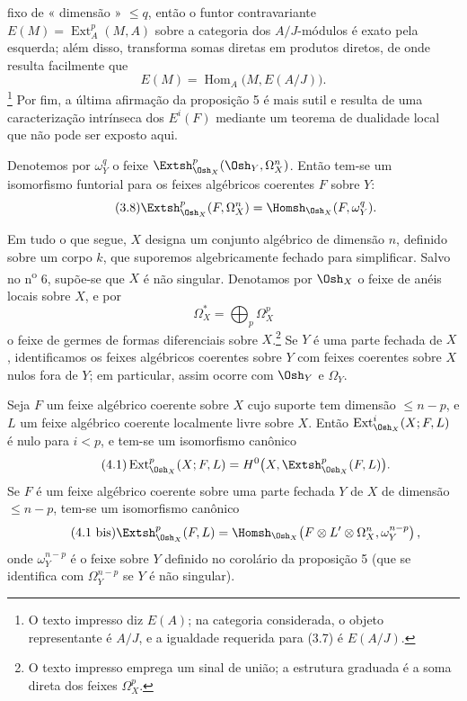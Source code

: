 fixo de « dimensão » $\leq q$, então o funtor contravariante
$E(M)=\operatorname{Ext}_{A}^{p}(M,A)$ sobre a categoria dos $A/J$-módulos é
exato pela esquerda; além disso, transforma somas diretas em produtos diretos,
de onde resulta facilmente que
\[
  E(M)=\operatorname{Hom}_{A}\bigl(M,E(A/J)\bigr).
\]
\footnote{O texto impresso diz $E(A)$; na categoria considerada, o objeto
representante é $A/J$, e a igualdade requerida para (3.7) é $E(A/J)$.} Por fim, a
última afirmação da proposição 5 é mais sutil e resulta de uma
caracterização intrínseca dos $E^{i}(F)$ mediante um teorema de dualidade
local que não pode ser exposto aqui.

 Denotemos por $\omega_Y^{q}$ o feixe
$\Extsh_{\Osh_X}^{p}(\Osh_Y,\Omega_X^{n})$. Então tem-se um isomorfismo
funtorial para os feixes algébricos coerentes $F$ sobre $Y$:
\begin{equation}\tag{3.8}
  \Extsh_{\Osh_X}^{p}(F,\Omega_X^{n})
  =\Homsh_{\Osh_X}(F,\omega_Y^{q}).
\end{equation}


Em tudo o que segue, $X$ designa um conjunto algébrico de dimensão $n$, definido
sobre um corpo $k$, que suporemos algebricamente fechado para simplificar. Salvo
no n\textsuperscript{o} 6, supõe-se que $X$ é não singular. Denotamos por
$\Osh_X$ o feixe de anéis locais sobre $X$, e por
\[
  \Omega_X^{*}=\bigoplus_p\Omega_X^{p}
\]
o feixe de germes de formas diferenciais sobre $X$.\footnote{O texto
impresso emprega um sinal de união; a estrutura graduada é a soma direta
dos feixes $\Omega_X^p$.} Se $Y$ é uma parte fechada de $X$, identificamos
os feixes algébricos coerentes sobre $Y$ com feixes coerentes sobre $X$
nulos fora de $Y$; em particular, assim ocorre com $\Osh_Y$ e $\Omega_Y$.

 Seja $F$ um feixe algébrico coerente sobre $X$ cujo
suporte tem dimensão $\leq n-p$, e $L$ um feixe algébrico coerente
localmente livre sobre $X$. Então $\operatorname{Ext}_{\Osh_X}^{i}(X;F,L)$ é nulo
para $i<p$, e tem-se um isomorfismo canônico
\begin{equation}\tag{4.1}
  \operatorname{Ext}_{\Osh_X}^{p}(X;F,L)
  =H^{0}\bigl(X,\Extsh_{\Osh_X}^{p}(F,L)\bigr).
\end{equation}
Se $F$ é um feixe algébrico coerente sobre uma parte fechada $Y$ de $X$ de
dimensão $\leq n-p$, tem-se um isomorfismo canônico
\begin{equation}\tag{4.1 bis}
  \Extsh_{\Osh_X}^{p}(F,L)
  =\Homsh_{\Osh_X}\!\left(
    F\otimes L'\otimes\Omega_X^{n},\omega_Y^{n-p}
  \right),
\end{equation}
onde $\omega_Y^{n-p}$ é o feixe sobre $Y$ definido no corolário da
proposição 5 (que se identifica com $\Omega_Y^{n-p}$ se $Y$ é não singular).

